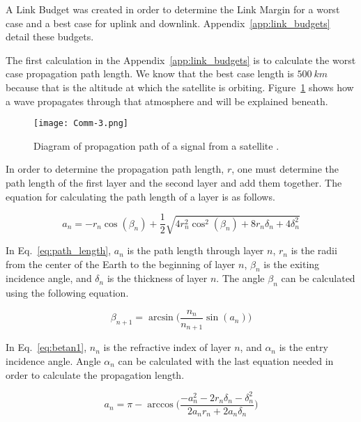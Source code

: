 \documentclass[12pt]{article}
\begin{document}
A Link Budget was created in order to determine the Link Margin for a worst case and a best case for uplink and downlink. Appendix~\ref{app:link_budgets} detail these budgets.

The first calculation in the Appendix~\ref{app:link_budgets} is to calculate the worst case propagation path length. We know that the best case length is $500\ km$ because that is the altitude at which the satellite is orbiting. Figure~\ref{fig:comm_angles} shows how a wave propagates through that atmosphere and will be explained beneath.

\begin{figure}[ht]
\centering
  \texttt{[image: Comm-3.png]}
\caption{Diagram of propagation path of a signal from a satellite \cite{ITU-R}.}
\label{fig:comm_angles}
\end{figure}

In order to determine the propagation path length, $r$, one must determine the path length of the first layer and the second layer and add them together. The equation for calculating \cite{ITU-R} the path length of a layer is as follows.

\begin{equation}\label{eq:path_length}
a_n = -r_n\cos(\beta_n) + \frac{1}{2}\sqrt{4r_n^2\cos^2(\beta_n)+8r_n\delta_n+4\delta_n^2} 
\end{equation}

In Eq.~\ref{eq:path_length}, $a_n$ is the path length through layer $n$, $r_n$ is the radii from the center of the Earth to the beginning of layer $n$, $\beta_n$ is the exiting incidence angle, and $\delta_n$ is the thickness of layer $n$.
The angle $\beta_n$ can be calculated \cite{ITU-R} using the following equation.

\begin{equation}\label{eq:betan1}
\beta_{n+1} = \arcsin\biggl(\frac{n_n}{n_{n+1}}\sin(a_n)\biggr) 
\end{equation}

In Eq.~\ref{eq:betan1}, $n_n$ is the refractive index of layer $n$, and $\alpha_n$ is the entry incidence angle. Angle $\alpha_n$ can be calculated with the last equation needed in order to calculate \cite{ITU-R} the propagation length.

\begin{equation}\label{eq:a_n}
a_n = \pi - \arccos \biggl(\frac{-a_n^2 - 2r_n\delta_n - \delta_n^2}{2a_n r_n + 2a_n \delta_n}\biggr) 
\end{equation}
\end{document}
